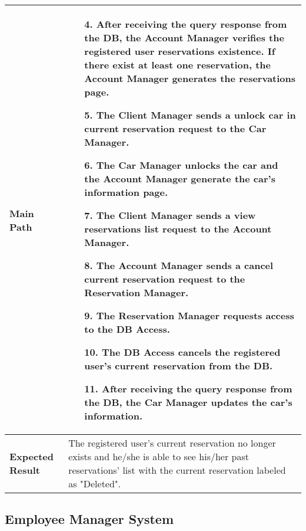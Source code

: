\begin{center}
		\begin{tabular} { | m{4.5cm} | m{8.5cm} | }
			\textbf{Main Path} & 
			\begin{enumerate}
				\item [4.]  After receiving the query response from the \textbf{DB}, the \textbf{Account Manager} verifies the registered user reservations existence. If there exist at least one reservation, the \textbf{Account Manager} generates the reservations page. 
			\item [5.] The \textbf{Client Manager} sends a unlock car in current reservation request to the \textbf{Car Manager}.
			\item [6.] The \textbf{Car Manager} unlocks the car and the \textbf{Account Manager} generate the car's information page.
			\item [7.] The \textbf{Client Manager} sends a view reservations list request to the \textbf{Account Manager}.
			\item [8.] The \textbf{Account Manager} sends a cancel current reservation request to the \textbf{Reservation Manager}.
			\item [9.] The \textbf{Reservation Manager} requests access to the \textbf{DB Access}.
			\item [10.] The \textbf{DB Access} cancels the registered user's current reservation from the \textbf{DB}.
			\item [11.] After receiving the query response from the \textbf{DB}, the \textbf{Car Manager} updates the car's information.
		\end{enumerate}\\
		\hline
		\textbf{Expected Result} & The registered user's current reservation no longer exists and he/she is able to see his/her past reservations' list with the current reservation labeled as "Deleted".\\
		\hline
	\end{tabular}
\end{center}
\newpage
\subsection{Employee Manager System}
